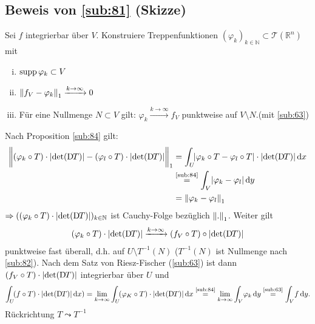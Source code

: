 \subsection*{Beweis von \ref{sub:81} (Skizze)} %
Sei $f$ integrierbar über $V$. Konstruiere Treppenfunktionen $(\varphi_k)_{k \in \mathds{N}} \subset \mathcal{T}(\mathds{R}^n)$ mit
\begin{enumerate}[(i)]
	\item $\operatorname{supp} \varphi_k  \subset V$
	\item $\norm[1]{f_V- \varphi_k} \xrightarrow{k \to \infty} 0$
	\item Für eine Nullmenge $N \subset V$ gilt: $\varphi_k \xrightarrow{k \to \infty} f_V$ punktweise auf $V \setminus N$.\hfill(mit \ref{sub:63})
\end{enumerate}
Nach Proposition \ref{sub:84} gilt:
\begin{align*}
	\norm[1]{(\varphi_k \circ T) \cdot \abs{\det(\D T)} - (\varphi_l \circ T) \cdot \abs{\det(\D T)}\rule{0cm}{0.45cm} } &= \int_U \! \abs{\varphi_k \circ T- \varphi_l \circ T} \cdot 
	\abs{\det(\D T)}  \, \mathrm{d}x \\
	&\stackrel{\text{\ref{sub:84}}}{=} \int_V \abs{\varphi_k - \varphi_l}  \, \mathrm{d}y  \\
	&= \norm[1]{\varphi_k - \varphi_l} 
\end{align*}
$\Rightarrow ( (\varphi_k \circ T) \cdot \lvert\det (\mathrm{D}\mkern-1.5mu T)\rvert )_{k \in \mathbb{N}} $ ist Cauchy-Folge bezüglich $\norm[1]{.} $. Weiter gilt 
\begin{align*}
	(\varphi_k \circ T) \cdot \lvert \det (\mathrm{D}\mkern-1.5mu T)\rvert \xrightarrow{k \to \infty} (f_V \circ T) \circ \lvert\det(\mathrm{D}\mkern-1.5mu T)\rvert 
\end{align*}
punktweise fast überall, d.h. auf $U \setminus T^{-1}(N)$ ($T ^{-1}(N)$ ist Nullmenge nach \ref{sub:82}). Nach dem Satz von Riesz-Fischer (\ref{sub:63}) ist dann
$(f_V \circ T) \cdot \lvert\det (\mathrm{D}\mkern-1.5mu T)\rvert $ integrierbar über $U$ und 
\[
	\int_U \!(f \circ T) \cdot \lvert \det (\mathrm{D}\mkern-1.5mu T)\rvert  \, \mathrm{d}x ) = \lim_{ k \to \infty} \int_U \! (\varphi_K \circ T) \cdot \lvert\det (\mathrm{D}\mkern-1.5mu T)\rvert  \, \mathrm{d}x   
	\stackrel{\text{\ref{sub:84}}}{=} \lim_{ k \to \infty} \int_V \! \varphi_k  \, \mathrm{d}y \stackrel{\text{\ref{sub:63}}}{=} \int_V \! f  \, \mathrm{d}y.
\]
Rückrichtung $T \leadsto T ^{-1}$ \bewende

